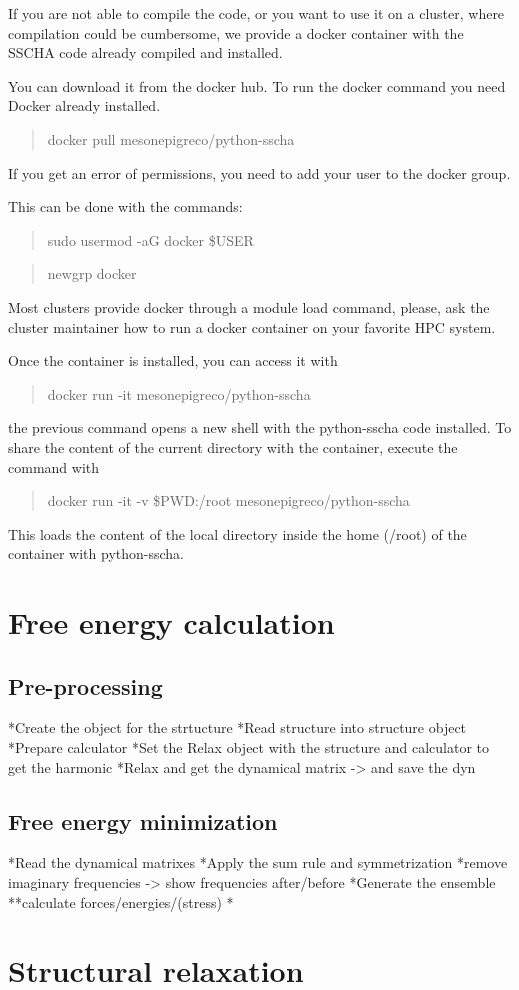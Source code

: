 \documentclass[]{report}
\begin{document}
If you are not able to compile the code, or you want to use it on a cluster, where compilation could be cumbersome, we provide a docker container with the SSCHA code already compiled and installed.

You can download it from the docker hub. To run the docker command you need Docker already installed.

\begin{quotation}
	docker pull mesonepigreco/python-sscha
\end{quotation}

If you get an error of permissions, you need to add your user to the docker group.

This can be done with the commands:

\begin{quotation}
	sudo usermod -aG docker \$USER
\end{quotation}
	
\begin{quotation}
		newgrp docker
\end{quotation}


Most clusters provide docker through a module load command, please, ask the cluster maintainer how to run a docker container on your favorite HPC system.

Once the container is installed, you can access it with

\begin{quotation}
	docker run -it mesonepigreco/python-sscha
\end{quotation}

the previous command opens a new shell with the python-sscha code installed. To share the content of the current directory with the container, execute the command with

\begin{quotation}
	docker run -it -v \$PWD:/root mesonepigreco/python-sscha
\end{quotation}

This loads the content of the local directory inside the home (/root) of the container with python-sscha.
\chapter{Free energy calculation}
\section{Pre-processing}
*Create the object for the strtucture
*Read structure into structure object
*Prepare calculator
*Set the Relax object with the structure and calculator to get the harmonic
*Relax and get the dynamical matrix -> and save the dyn
\section{Free energy minimization}
*Read the dynamical matrixes
*Apply the sum rule and symmetrization
*remove imaginary frequencies -> show frequencies after/before
*Generate the ensemble
**calculate forces/energies/(stress)
*
\chapter{Structural relaxation}
\end{document}
